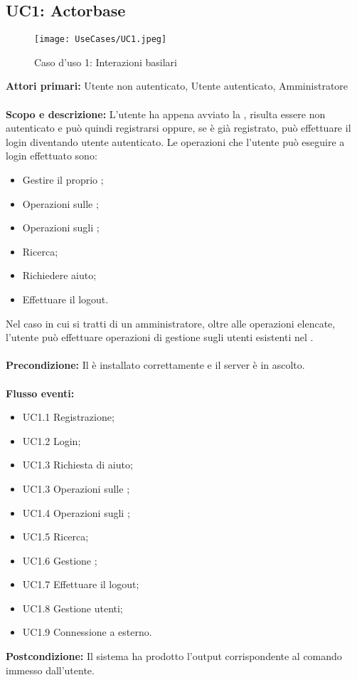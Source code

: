 \documentclass{scalatekids-article}
\begin{document}
\subsection{UC1: Actorbase}
\begin{figure}[H]
  \begin{center}
    \texttt{[image: UseCases/UC1.jpeg]}
    \caption{Caso d'uso 1: Interazioni basilari}
  \end{center}
\end{figure}
\textbf{Attori primari:} Utente non autenticato, Utente autenticato, Amministratore\\ \\
\textbf{Scopo e descrizione:}
L’utente ha appena avviato la , risulta essere non autenticato e può quindi
registrarsi oppure, se è già registrato, può effettuare il login diventando utente
autenticato. Le operazioni che l'utente può eseguire a login effettuato sono:
\begin{itemize}
\item Gestire il proprio ;
\item Operazioni sulle ;
\item Operazioni sugli ;
\item Ricerca;
\item Richiedere aiuto;
\item Effettuare il logout.
\end{itemize}
Nel caso in cui si tratti di un amministratore, oltre alle operazioni elencate, l'utente può effettuare operazioni di gestione sugli utenti
esistenti nel .\\ \\
\textbf{Precondizione:} Il  è installato correttamente e il server è in ascolto.\\ \\
\textbf{Flusso eventi:}
\begin{itemize}
\item UC1.1 Registrazione;
\item UC1.2 Login;
\item UC1.3 Richiesta di aiuto;
\item UC1.3 Operazioni sulle ;
\item UC1.4 Operazioni sugli ;
\item UC1.5 Ricerca;
\item UC1.6 Gestione ;
\item UC1.7 Effettuare il logout;
\item UC1.8 Gestione utenti;
\item UC1.9 Connessione a  esterno.
\end{itemize}
\textbf{Postcondizione:} Il sistema ha prodotto l'output corrispondente al comando immesso dall'utente.
\end{document}
